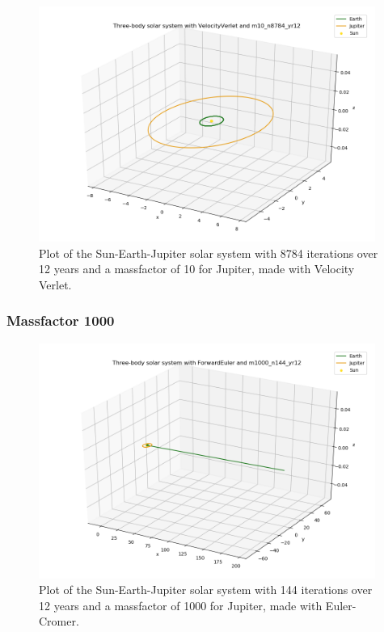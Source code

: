 \documentclass{article}
\begin{document}
    \begin{figure}[H]
        \centering
        \includegraphics[width = 11cm]{img/plot3D_S_E_J_V_m10_n8784_yr12.png}
        \caption{Plot of the Sun-Earth-Jupiter solar system with 8784 iterations over 12 years and a massfactor of 10 for Jupiter, made with Velocity Verlet.}
        \label{fig:plot3D_S_E_J_V_m10_n8784_yr12}
    \end{figure}

\subsubsection{Massfactor 1000}

    \begin{figure}[H]
        \centering
        \includegraphics[width = 11cm]{img/plot3D_S_E_J_F_m1000_n144_yr12.png}
        \caption{Plot of the Sun-Earth-Jupiter solar system with 144 iterations over 12 years and a massfactor of 1000 for Jupiter, made with Euler-Cromer.}
        \label{fig:plot3D_S_E_J_F_m1000_n144_yr12}
    \end{figure}
\end{document}
